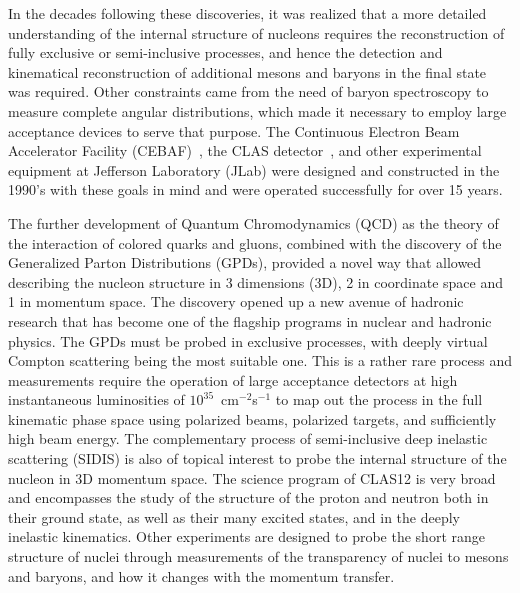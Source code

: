 \documentclass[final,3p]{elsarticle}
\begin{document}
\begin{twocolumn}
In the decades following these discoveries, it was realized that a more detailed understanding of the internal
structure of nucleons requires the reconstruction of fully exclusive or semi-inclusive processes, and hence the
detection and kinematical reconstruction of additional mesons and baryons in the final state was required.  Other
constraints came from the need of baryon spectroscopy to measure complete angular distributions, which made it
necessary to employ large acceptance devices to serve that purpose. The Continuous Electron Beam Accelerator
Facility (CEBAF)~\cite{Leemann:2001dg}, the CLAS detector~\cite{Mecking:2003zu}, and other experimental
equipment at Jefferson Laboratory (JLab) were designed and constructed in the 1990's with these goals in mind
and were operated successfully for over 15 years. 

The further development of Quantum Chromodynamics (QCD) as the theory of the interaction of colored quarks and
gluons, combined with the discovery of the Generalized Parton Distributions (GPDs), provided a novel way that allowed
describing the nucleon structure in 3 dimensions (3D), 2 in coordinate space and 1 in momentum space. The discovery
opened up a new avenue of hadronic research that has become one of the flagship programs in nuclear and hadronic
physics. The GPDs must be probed in exclusive processes, with deeply virtual Compton scattering being the most
suitable one. This is a rather rare process and measurements require the operation of large acceptance detectors 
at high instantaneous luminosities of $10^{35}$~cm$^{-2}$s$^{-1}$ to map out the process in the full kinematic phase
space using polarized beams, polarized targets, and sufficiently high beam energy. The complementary process of
semi-inclusive deep inelastic scattering (SIDIS) is also of topical interest to probe the internal structure of the
nucleon in 3D momentum space. The science program of CLAS12 is very broad~\cite{Burkert:2018nvj} and
encompasses the study of the structure of the proton and neutron both in their ground state, as well as their many
excited states, and in the deeply inelastic kinematics. Other experiments are designed to probe the short range
structure of nuclei through measurements of the transparency of nuclei to mesons and baryons, and how it changes
with the momentum transfer.   


\end{twocolumn}
\end{document}
